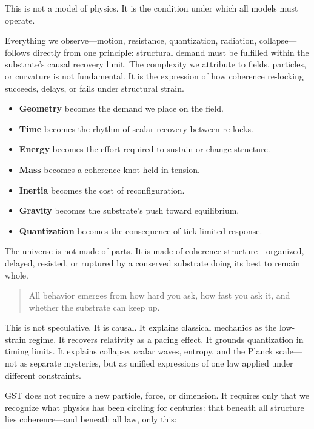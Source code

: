 \documentclass[entropy,article,submit,pdftex,moreauthors]{Definitions/mdpi}
\begin{document}
This is not a model of physics. It is the condition under which all models must operate.

Everything we observe—motion, resistance, quantization, radiation, collapse—follows directly from one principle: structural demand must be fulfilled within the substrate’s causal recovery limit. The complexity we attribute to fields, particles, or curvature is not fundamental. It is the expression of how coherence re-locking succeeds, delays, or fails under structural strain.

\begin{itemize}
    \item \textbf{Geometry} becomes the demand we place on the field.
    \item \textbf{Time} becomes the rhythm of scalar recovery between re-locks.
    \item \textbf{Energy} becomes the effort required to sustain or change structure.
    \item \textbf{Mass} becomes a coherence knot held in tension.
    \item \textbf{Inertia} becomes the cost of reconfiguration.
    \item \textbf{Gravity} becomes the substrate’s push toward equilibrium.
    \item \textbf{Quantization} becomes the consequence of tick-limited response.
\end{itemize}

The universe is not made of parts. It is made of coherence structure—organized, delayed, resisted, or ruptured by a conserved substrate doing its best to remain whole.

\begin{quote}
All behavior emerges from how hard you ask, how fast you ask it, and whether the substrate can keep up.
\end{quote}

This is not speculative. It is causal. It explains classical mechanics as the low-strain regime. It recovers relativity as a pacing effect. It grounds quantization in timing limits. It explains collapse, scalar waves, entropy, and the Planck scale—not as separate mysteries, but as unified expressions of one law applied under different constraints.

GST does not require a new particle, force, or dimension. It requires only that we recognize what physics has been circling for centuries: that beneath all structure lies coherence—and beneath all law, only this:
\end{document}
